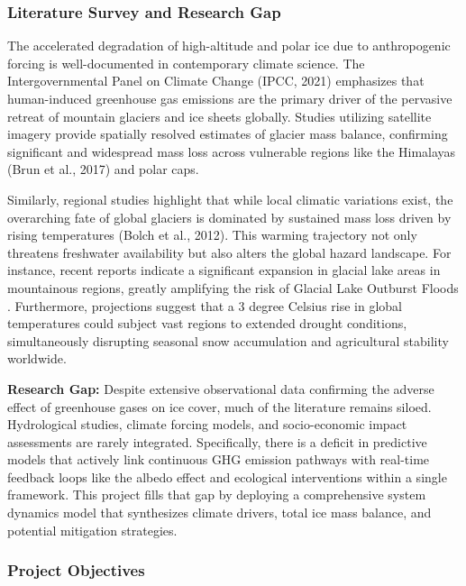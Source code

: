 \documentclass[12pt, a4paper]{article}
\begin{document}
\subsubsection*{Literature Survey and Research Gap}

The accelerated degradation of high-altitude and polar ice due to anthropogenic forcing is well-documented in contemporary climate science. The Intergovernmental Panel on Climate Change (IPCC, 2021) emphasizes that human-induced greenhouse gas emissions are the primary driver of the pervasive retreat of mountain glaciers and ice sheets globally. Studies utilizing satellite imagery provide spatially resolved estimates of glacier mass balance, confirming significant and widespread mass loss across vulnerable regions like the Himalayas (Brun et al., 2017) and polar caps.

Similarly, regional studies highlight that while local climatic variations exist, the overarching fate of global glaciers is dominated by sustained mass loss driven by rising temperatures (Bolch et al., 2012). This warming trajectory not only threatens freshwater availability but also alters the global hazard landscape. For instance, recent reports indicate a significant expansion in glacial lake areas in mountainous regions, greatly amplifying the risk of Glacial Lake Outburst Floods \cite{hindu2024}. Furthermore, projections suggest that a 3 degree Celsius rise in global temperatures could subject vast regions to extended drought conditions, simultaneously disrupting seasonal snow accumulation and agricultural stability worldwide.

\vspace{1em}
\noindent \textbf{Research Gap:} Despite extensive observational data confirming the adverse effect of greenhouse gases on ice cover, much of the literature remains siloed. Hydrological studies, climate forcing models, and socio-economic impact assessments are rarely integrated. Specifically, there is a deficit in predictive models that actively link continuous GHG emission pathways with real-time feedback loops like the albedo effect and ecological interventions within a single framework. This project fills that gap by deploying a comprehensive system dynamics model that synthesizes climate drivers, total ice mass balance, and potential mitigation strategies.

\subsubsection*{Project Objectives}
\end{document}
